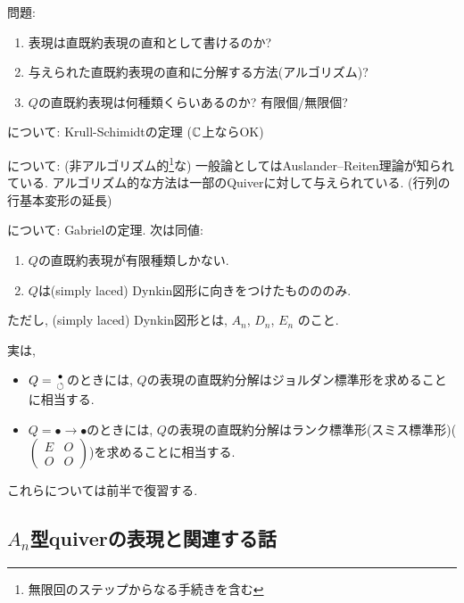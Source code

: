 問題:
\begin{enumerate}
\item
  \label{basicquestion:ks}
  表現は直既約表現の直和として書けるのか?
\item
  \label{basicquestion:ar}
  与えられた直既約表現の直和に分解する方法(アルゴリズム)?
\item
  \label{basicquestion:gt}
  $Q$の直既約表現は何種類くらいあるのか?
  有限個/無限個?
\end{enumerate}

について:
Krull-Schimidtの定理 ($\mathbb{C}$上ならOK)

について:
(非アルゴリズム的\footnote{無限回のステップからなる手続きを含む}な)
一般論としてはAuslander--Reiten理論が知られている.
アルゴリズム的な方法は一部のQuiverに対して与えられている.
(行列の行基本変形の延長)

について:
Gabrielの定理.
次は同値:
\begin{enumerate}
\item
  $Q$の直既約表現が有限種類しかない.
\item
  $Q$は(simply laced) Dynkin図形に向きをつけたものののみ.
\end{enumerate}
ただし, (simply laced) Dynkin図形とは,
\ZU
$A_n$, $D_n$, $E_n$
のこと.


実は, \ZU
\begin{itemize}
\item
  $Q=\genfrac{}{}{0pt}{}{\bullet}{\circlearrowleft}$のときには,
  $Q$の表現の直既約分解はジョルダン標準形を求めることに相当する.
\item
  $Q=\bullet\to\bullet$のときには,
  $Q$の表現の直既約分解はランク標準形(スミス標準形)($\begin{pmatrix}E&O\\O&O\end{pmatrix}$)を求めることに相当する.
\end{itemize}
これらについては前半で復習する.


\subsection{$A_n$型quiverの表現と関連する話}
